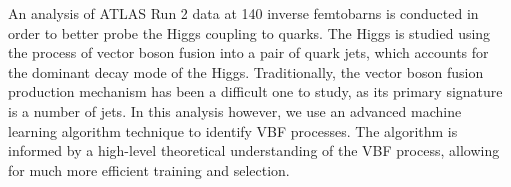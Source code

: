 \documentclass[paper=a4,fontsize=12pt]{article}
\begin{document}
An analysis of ATLAS Run 2 data at 140 inverse femtobarns is conducted in order to better probe the Higgs coupling to quarks. The Higgs is studied using the process of vector boson fusion into a pair of quark jets, which accounts for the dominant decay mode of the Higgs. Traditionally, the vector boson fusion production mechanism has been a difficult one to study, as its primary signature is a number of jets. In this analysis however, we use an advanced machine learning algorithm technique to identify VBF processes. The algorithm is informed by a high-level theoretical understanding of the VBF process, allowing for much more efficient training and selection.
\end{document}
